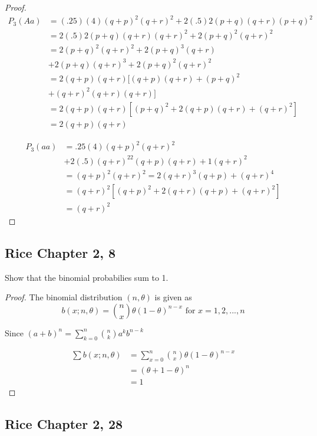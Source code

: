 \documentclass{tufte-book}
\theoremstyle{mytheoremstyle}
\theoremstyle{mylemstyle}
\theoremstyle{mydefstyle}
\begin{document}
\begin{enumerate}
\begin{proof}
\begin{align*}
P_3(Aa) &= (.25)(4)(q+p)^2(q+r)^2 + 2(.5)2(p+q)(q+r)(p+q)^2\\
&= 2(.5)2(p+q)(q+r)(q+r)^2 + 2(p+q)^2(q+r)^2\\
&= 2(p+q)^2(q+r)^2 + 2(p+q)^3(q+r)\\
&+ 2(p+q)(q+r)^3 + 2(p+q)^2(q+r)^2\\
&= 2(q+p)(q+r)[(q+p)(q+r) + (p+q)^2\\
&+ (q+r)^2 (q+r)(q+r)]\\
&= 2(q+p)(q+r)[(p+q)^2 + 2(q+p)(q+r) +(q+r)^2]\\
&= 2(q+p)(q+r)
\end{align*}

\begin{align*}
P_3(aa) &= .25(4)(q+p)^2(q+r)^2\\
&+ 2(.5)(q+r)^22(q+p)(q+r) + 1(q+r)^2\\
&= (q+p)^2(q+r)^2 = 2(q+r)^3(q+p) + (q+r)^4\\
&= (q+r)^2[(q+p)^2 + 2(q+r)(q+p) + (q+r)^2]\\
&= (q+r)^2
\end{align*}

\end{proof}

\end{enumerate}


\subsection{Rice Chapter 2, 8}
Show that the binomial probabilies sum to 1.

\begin{proof}The binomial distribution $(n,\theta)$ is given as
\[ b(x;n,\theta) = \binom{n}{x}\theta(1-\theta)^{n-x}  \text{ for } x=1,2,...,n\]

Since $(a+b)^n=\sum_{k=0}^n\binom{n}{k}a^kb^{n-k}$

\begin{align*}
\sum b(x;n,\theta) &= \sum_{x=0}^{n}\binom{n}{x}\theta(1-\theta)^{n-x}\\
&= (\theta+1-\theta )^n\\
&= 1
\end{align*}
\end{proof}


\subsection{Rice Chapter 2, 28}
\end{document}
